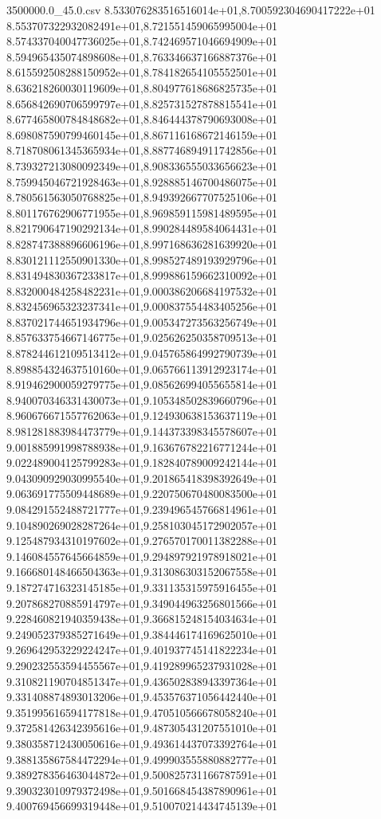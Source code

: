 \begin{filecontents*}{3500000.0_45.0.csv}
8.533076283516516014e+01,8.700592304690417222e+01
8.553707322932082491e+01,8.721551459065995004e+01
8.574337040047736025e+01,8.742469571046694909e+01
8.594965435074898608e+01,8.763346637166887376e+01
8.615592508288150952e+01,8.784182654105552501e+01
8.636218260030119609e+01,8.804977618686825735e+01
8.656842690706599797e+01,8.825731527878815541e+01
8.677465800784848682e+01,8.846444378790693008e+01
8.698087590799460145e+01,8.867116168672146159e+01
8.718708061345365934e+01,8.887746894911742856e+01
8.739327213080092349e+01,8.908336555033656623e+01
8.759945046721928463e+01,8.928885146700486075e+01
8.780561563050768825e+01,8.949392667707525106e+01
8.801176762906771955e+01,8.969859115981489595e+01
8.821790647190292134e+01,8.990284489584064431e+01
8.828747388896606196e+01,8.997168636281639920e+01
8.830121112550901330e+01,8.998527489193929796e+01
8.831494830367233817e+01,8.999886159662310092e+01
8.832000484258482231e+01,9.000386206684197532e+01
8.832456965323237341e+01,9.000837554483405256e+01
8.837021744651934796e+01,9.005347273563256749e+01
8.857633754667146775e+01,9.025626250358709513e+01
8.878244612109513412e+01,9.045765864992790739e+01
8.898854324637510160e+01,9.065766113912923174e+01
8.919462900059279775e+01,9.085626994055655814e+01
8.940070346331430073e+01,9.105348502839660796e+01
8.960676671557762063e+01,9.124930638153637119e+01
8.981281883984473779e+01,9.144373398345578607e+01
9.001885991998788938e+01,9.163676782216771244e+01
9.022489004125799283e+01,9.182840789009242144e+01
9.043090929030995540e+01,9.201865418398392649e+01
9.063691775509448689e+01,9.220750670480083500e+01
9.084291552488721777e+01,9.239496545766814961e+01
9.104890269028287264e+01,9.258103045172902057e+01
9.125487934310197602e+01,9.276570170011382288e+01
9.146084557645664859e+01,9.294897921978918021e+01
9.166680148466504363e+01,9.313086303152067558e+01
9.187274716323145185e+01,9.331135315975916455e+01
9.207868270885914797e+01,9.349044963256801566e+01
9.228460821940359438e+01,9.366815248154034634e+01
9.249052379385271649e+01,9.384446174169625010e+01
9.269642953229224247e+01,9.401937745141822234e+01
9.290232553594455567e+01,9.419289965237931028e+01
9.310821190704851347e+01,9.436502838943397364e+01
9.331408874893013206e+01,9.453576371056442440e+01
9.351995616594177818e+01,9.470510566678058240e+01
9.372581426342395616e+01,9.487305431207551010e+01
9.380358712430050616e+01,9.493614437073392764e+01
9.388135867584472294e+01,9.499903555880882777e+01
9.389278356463044872e+01,9.500825731166787591e+01
9.390323010979372498e+01,9.501668454387890961e+01
9.400769456699319448e+01,9.510070214434745139e+01

\end{filecontents*}
